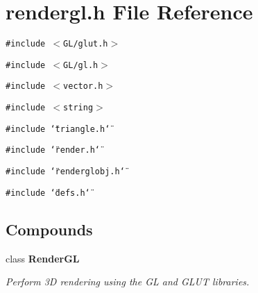 \section{rendergl.h File Reference}
\label{rendergl_h}
{\tt \#include $<$GL/glut.h$>$}\par
{\tt \#include $<$GL/gl.h$>$}\par
{\tt \#include $<$vector.h$>$}\par
{\tt \#include $<$string$>$}\par
{\tt \#include \char`\"{}triangle.h\char`\"{}}\par
{\tt \#include \char`\"{}render.h\char`\"{}}\par
{\tt \#include \char`\"{}renderglobj.h\char`\"{}}\par
{\tt \#include \char`\"{}defs.h\char`\"{}}\par
\subsection*{Compounds}
\begin{CompactItemize}
\item 
class {\bf Render\-GL}
\begin{CompactList}\small\item\em Perform 3D rendering using the GL and GLUT libraries.\item\end{CompactList}\end{CompactItemize}
